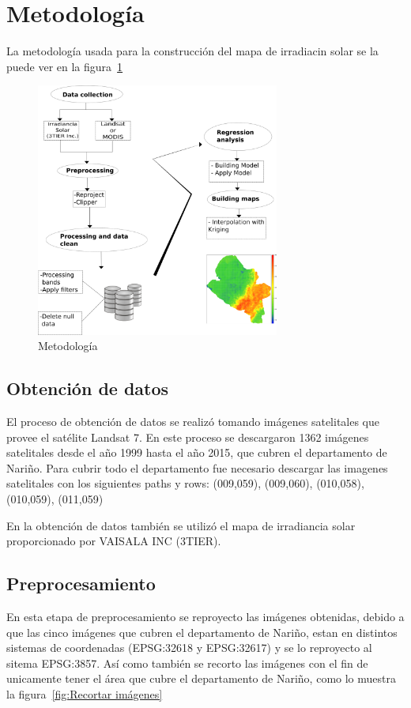 
\section{Metodología}

La metodología usada para la construcción del mapa de irradiacin solar se la puede ver en la figura~\ref{fig:metodology}

\begin{figure}
  \centering
  \includegraphics[width = 8cm]{metodology.png}
  \caption{Metodología}
  \label{fig:metodology}
\end{figure}

\subsection{Obtención de datos}

El proceso de obtención de datos se realizó tomando imágenes satelitales que provee el satélite
Landsat 7. En este proceso se descargaron 1362 imágenes satelitales desde el año 1999 hasta el año 2015, que cubren el 
departamento de Nariño. Para cubrir todo el departamento fue necesario descargar las imagenes satelitales con 
los siguientes paths y rows: (009,059), (009,060), (010,058), (010,059), (011,059) 

En la obtención de datos también se utilizó el mapa de irradiancia solar proporcionado por VAISALA INC (3TIER).

\subsection{Preprocesamiento}

En esta etapa de preprocesamiento se reproyecto las imágenes obtenidas, debido a que las cinco imágenes
que cubren el departamento de Nariño, estan en distintos sistemas de coordenadas (EPSG:32618 y EPSG:32617) y se 
lo reproyecto al sitema EPSG:3857. Así como también se recorto las imágenes con el fin de unicamente tener 
el área que cubre el departamento de Nariño, como lo muestra la figura~\ref{fig:Recortar imágenes}

